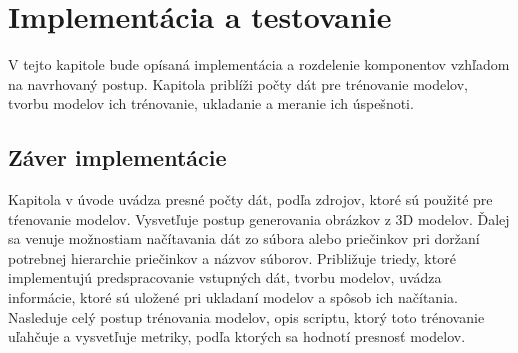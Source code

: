 
\chapter{Implementácia a testovanie}

V tejto kapitole bude opísaná implementácia a rozdelenie komponentov vzhľadom na navrhovaný postup.
Kapitola priblíži počty dát pre trénovanie modelov, tvorbu modelov ich trénovanie, ukladanie a meranie ich úspešnoti.









\section{Záver implementácie}

Kapitola v úvode uvádza presné počty dát, podľa zdrojov, ktoré sú použité pre tŕenovanie modelov.
Vysvetľuje postup generovania obrázkov z 3D modelov.
Ďalej sa venuje možnostiam načítavania dát zo súbora alebo priečinkov pri doržaní potrebnej hierarchie priečinkov a názvov súborov.
Približuje triedy, ktoré implementujú predspracovanie vstupných dát, tvorbu modelov, uvádza informácie, ktoré sú uložené
    pri ukladaní modelov a spôsob ich načítania.
Nasleduje celý postup trénovania modelov, opis scriptu, ktorý toto trénovanie uľahčuje a vysvetľuje metriky, podľa ktorých sa hodnotí presnosť modelov.
